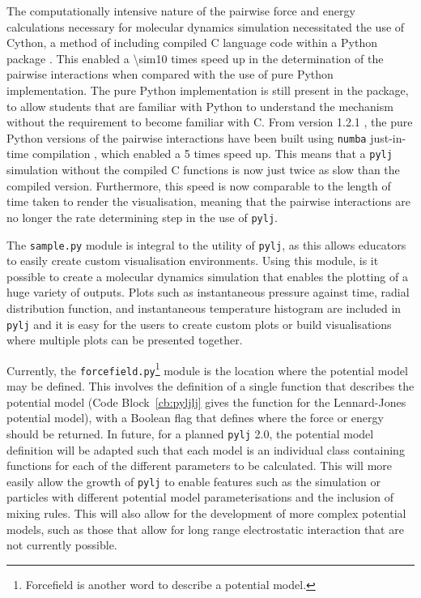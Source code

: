 The computationally intensive nature of the pairwise force and energy calculations necessary for molecular dynamics simulation necessitated the use of Cython, a method of including compiled C language code within a Python package \cite{noauthor_cython_nodate}.
This enabled a \num{\sim10} times speed up in the determination of the pairwise interactions when compared with the use of pure Python implementation.
The pure Python implementation is still present in the package, to allow students that are familiar with Python to understand the mechanism without the requirement to become familiar with C.
From version 1.2.1 \cite{mccluskey_arm61/pylj_2019-1}, the pure Python versions of the pairwise interactions have been built using \texttt{numba} just-in-time compilation \cite{noauthor_numba_nodate}, which enabled a \num{5} times speed up.
This means that a \texttt{pylj} simulation without the compiled C functions is now just twice as slow than the compiled version.
Furthermore, this speed is now comparable to the length of time taken to render the visualisation, meaning that the pairwise interactions are no longer the rate determining step in the use of \texttt{pylj}.

The \texttt{sample.py} module is integral to the utility of \texttt{pylj}, as this allows educators to easily create custom visualisation environments.
Using this module, is it possible to create a molecular dynamics simulation that enables the plotting of a huge variety of outputs.
Plots such as instantaneous pressure against time, radial distribution function, and instantaneous temperature histogram are included in \texttt{pylj} and it is easy for the users to create custom plots or build visualisations where multiple plots can be presented together.

Currently, the \texttt{forcefield.py}\footnote{Forcefield is another word to describe a potential model.} module is the location where the potential model may be defined.
This involves the definition of a single function that describes the potential model (Code Block~\ref{cb:pyljlj} gives the function for the Lennard-Jones potential model), with a Boolean flag that defines where the force or energy should be returned.
In future, for a planned \texttt{pylj} \num{2.0}, the potential model definition will be adapted such that each model is an individual class containing functions for each of the different parameters to be calculated.
This will more easily allow the growth of \texttt{pylj} to enable features such as the simulation or particles with different potential model parameterisations and the inclusion of mixing rules.
This will also allow for the development of more complex potential models, such as those that allow for long range electrostatic interaction that are not currently possible.
%
\begin{figure}
    \centering
        
\end{figure}
%

